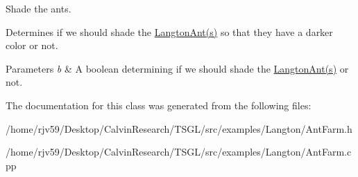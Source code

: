 Shade the ants. 

Determines if we should shade the \hyperlink{class_langton_ant}{Langton\+Ant(s)} so that they have a darker color or not. 
\begin{DoxyParams}{Parameters}
{\em b} & A boolean determining if we should shade the \hyperlink{class_langton_ant}{Langton\+Ant(s)} or not. \\
\hline
\end{DoxyParams}


The documentation for this class was generated from the following files\+:\begin{DoxyCompactItemize}
\item 
/home/rjv59/\+Desktop/\+Calvin\+Research/\+T\+S\+G\+L/src/examples/\+Langton/Ant\+Farm.\+h\item 
/home/rjv59/\+Desktop/\+Calvin\+Research/\+T\+S\+G\+L/src/examples/\+Langton/Ant\+Farm.\+cpp\end{DoxyCompactItemize}
